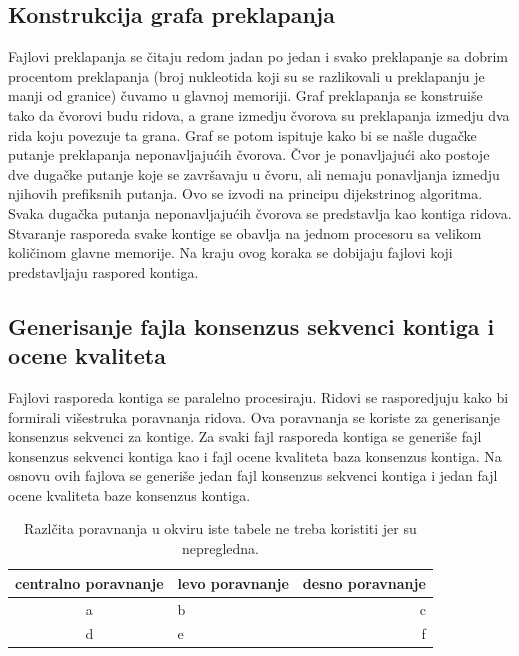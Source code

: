 \documentclass[a4paper]{article}
\begin{document}
{\subsection{Konstrukcija grafa preklapanja}
\label{subsec:kgp}
Fajlovi preklapanja se čitaju redom jadan po jedan i svako preklapanje sa dobrim procentom preklapanja (broj nukleotida koji su se razlikovali u preklapanju je manji od granice) čuvamo u glavnoj memoriji. Graf preklapanja se konstruiše tako da čvorovi budu ridova, a grane izmedju čvorova su preklapanja izmedju dva rida koju povezuje ta grana. Graf se potom ispituje kako bi se našle dugačke putanje preklapanja neponavljajućih čvorova. Čvor je ponavljajući ako postoje dve dugačke putanje koje se završavaju u čvoru, ali nemaju ponavljanja izmedju njihovih prefiksnih putanja. Ovo se izvodi na principu dijekstrinog algoritma. Svaka dugačka putanja neponavljajućih čvorova se predstavlja kao kontiga ridova. Stvaranje rasporeda svake kontige se obavlja na jednom procesoru sa velikom količinom glavne memorije. Na kraju ovog koraka se dobijaju fajlovi koji predstavljaju raspored kontiga.
\subsection{Generisanje fajla konsenzus sekvenci kontiga i ocene kvaliteta}
\label{subsec:gfkskiok}
 Fajlovi rasporeda kontiga se paralelno procesiraju. Ridovi se rasporedjuju kako bi formirali višestruka poravnanja ridova. Ova poravnanja se koriste za generisanje konsenzus sekvenci za kontige. Za svaki fajl rasporeda kontiga se generiše fajl konsenzus sekvenci kontiga kao i fajl ocene kvaliteta baza konsenzus kontiga. Na osnovu ovih fajlova se generiše jedan fajl konsenzus sekvenci kontiga i jedan fajl ocene kvaliteta baze konsenzus kontiga.

\iffalse


\begin{table}[h!]
\begin{center}
\caption{Razlčita poravnanja u okviru iste tabele ne treba koristiti jer su nepregledna.}
\begin{tabular}{|c|l|r|} \hline
centralno poravnanje& levo poravnanje& desno poravnanje\\ \hline
a &b&c\\ \hline
d &e&f\\ \hline
\end{tabular}
\label{tab:tabela1}
\end{center}
\end{table}

}
\end{document}
